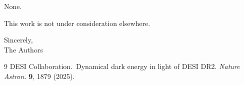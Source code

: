 \documentclass[12pt]{article}
\begin{document}
\vspace{8pt}

 None.

\vspace{8pt}

\noindent This work is not under consideration elsewhere.

\vspace{14pt}

\noindent Sincerely,\\
\vspace{8pt}
\noindent The Authors

\vspace{14pt}

\begin{thebibliography}{9}
 DESI Collaboration.\ Dynamical dark energy in light of DESI DR2. {\it Nature Astron.} {\bf 9}, 1879 (2025).
\end{thebibliography}
\end{document}
